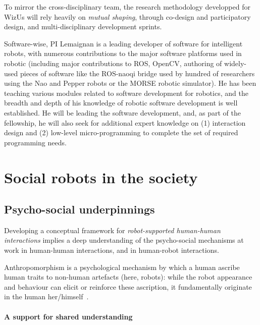 \documentclass[11pt,a4paper]{report}
\newcommand{\project}{WizUs\xspace}
\begin{document}
To mirror the cross-disciplinary team, the research methodology developped for
\project will rely heavily on \emph{mutual shaping}, through co-design and
participatory design, and multi-disciplinary development sprints.

Software-wise, PI Lemaignan is a leading developer of software for intelligent
robots, with numerous contributions to the major software platforms used in
robotic (including major contributions to ROS, OpenCV, authoring of widely-used
pieces of software like the ROS-naoqi bridge used by hundred of researchers
using the Nao and Pepper robots or the MORSE robotic simulator). He has been
teaching various modules related to software development for robotics, and the
breadth and depth of his knowledge of robotic software development is well
established. He will be leading the software development, and, as part of the
fellowship, he will also seek for additional expert knowledge on (1) interaction
design and (2) low-level micro-programming to complete the set of required
programming needs.






\section{Social robots in the society}

\subsection{Psycho-social underpinnings}

Developing a conceptual framework for \emph{robot-supported human-human
interactions} implies a deep understanding of the psycho-social mechanisms at
work in human-human interactions, and in human-robot interactions.

Anthropomorphism is a psychological mechanism by which a human
ascribe human traits to non-human artefacts (here, robots): while the
robot appearance and behaviour can elicit or reinforce these ascription,
it fundamentally originate in the human her/himself~\cite{fink}.


\paragraph{A support for shared understanding}
\end{document}
